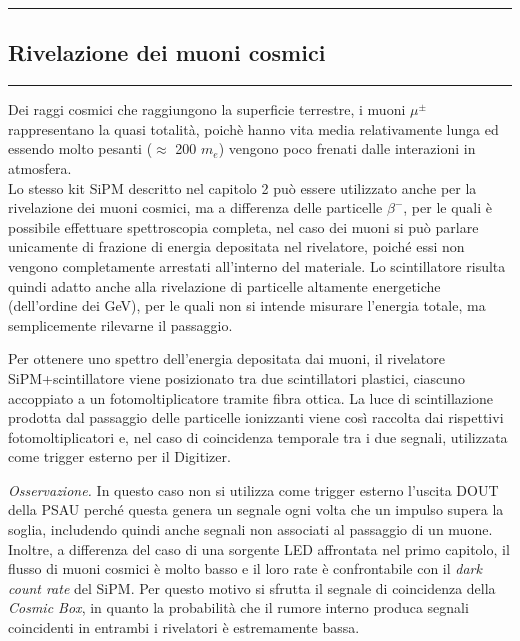 \newpage
{\color{gray}\hrule}
\begin{center}
\section{Rivelazione dei muoni cosmici }
\bigskip
\end{center}
{\color{gray}\hrule}
Dei raggi cosmici che raggiungono la superficie terrestre, i muoni $\mu^{\pm}$ rappresentano la quasi totalità, poichè hanno vita
media relativamente lunga ed essendo molto pesanti ($\approx $ 200 $m_e$) vengono poco frenati dalle interazioni in atmosfera.\\ Lo stesso kit SiPM descritto nel capitolo 2 può essere utilizzato anche per la rivelazione dei muoni cosmici, ma a differenza delle particelle $\beta^-$, per le quali è possibile effettuare spettroscopia completa, nel caso dei muoni si può parlare unicamente di frazione di energia depositata nel rivelatore, poiché essi non vengono completamente arrestati all’interno del materiale.
Lo scintillatore risulta quindi adatto anche alla rivelazione di particelle altamente energetiche (dell’ordine dei GeV), per le quali non si intende misurare l’energia totale, ma semplicemente rilevarne il passaggio.

Per ottenere uno spettro dell’energia depositata dai muoni, il rivelatore 
SiPM+scintillatore viene posizionato tra due scintillatori plastici, ciascuno 
accoppiato a un fotomoltiplicatore tramite fibra ottica.
La luce di scintillazione prodotta dal passaggio delle particelle ionizzanti 
viene così raccolta dai rispettivi fotomoltiplicatori e, nel caso di coincidenza temporale 
tra i due segnali, utilizzata come trigger esterno per il Digitizer.

\textit{Osservazione.} In questo caso non si utilizza come trigger esterno l’uscita DOUT della PSAU perché questa genera un segnale ogni volta che un impulso supera la soglia, includendo quindi anche segnali non associati al passaggio di un muone. Inoltre, a differenza del caso di una sorgente LED affrontata nel primo capitolo, il flusso
di muoni cosmici è molto basso e il loro rate è confrontabile con il \textit{dark count rate} del SiPM. Per questo motivo si sfrutta il segnale di coincidenza della \textit{Cosmic Box}, in quanto la probabilità che il rumore interno produca segnali coincidenti in entrambi i rivelatori è estremamente bassa.

